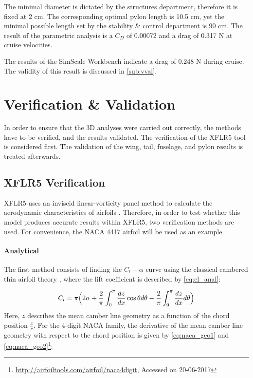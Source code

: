 The minimal diameter is dictated by the structures department, therefore it is fixed at 2 cm. The corresponding optimal pylon length is 10.5 cm, yet the minimal possible length set by the stability \& control department is 90 cm. The result of the parametric analysis is a $C_{D}$ of 0.00072 and a drag of 0.317 N at cruise velocities.

The results of the SimScale Workbench indicate a drag of 0.248 N during cruise. The validity of this result is discussed in \autoref{sub:vval}.

\section{Verification \& Validation}
\label{sec:aero_vali}

In order to ensure that the 3D analyses were carried out correctly, the methods have to be verified, and the results validated. The verification of the XFLR5 tool is considered first. The validation of the wing, tail, fuselage, and pylon results is treated afterwards.

\subsection{XFLR5 Verification}

XFLR5 uses an inviscid linear-vorticity panel method to calculate the aerodynamic characteristics of airfoils \cite[1]{xfoil}. Therefore, in order to test whether this model produces accurate results within XFLR5, two verification methods are used. For convenience, the NACA 4417 airfoil will be used as an example.

\paragraph{Analytical} The first method consists of finding the $C_{l}-\alpha$ curve using the classical cambered thin airfoil theory \cite[348]{anderson}, where the lift coefficient is described by \autoref{eq:cl_anal}:

\begin{equation}
\label{eq:cl_anal}
    C_{l} = \pi \Big{(}2\alpha+\frac{2}{\pi}\int_{0}^{\pi}\frac{dz}{dx}\cos{\theta}d\theta-\frac{2}{\pi}\int_{0}^{\pi}\frac{dz}{dx}d\theta\Big{)}
\end{equation}
Here, $z$ describes the mean camber line geometry as a function of the chord position $\frac{x}{c}$. For the 4-digit NACA family, the derivative of the mean camber line geometry with respect to the chord position is given by \autoref{eq:naca_geo1} and \ref{eq:naca_geo2}\footnote{\url{http://airfoiltools.com/airfoil/naca4digit}, Accessed on 20-06-2017}:


